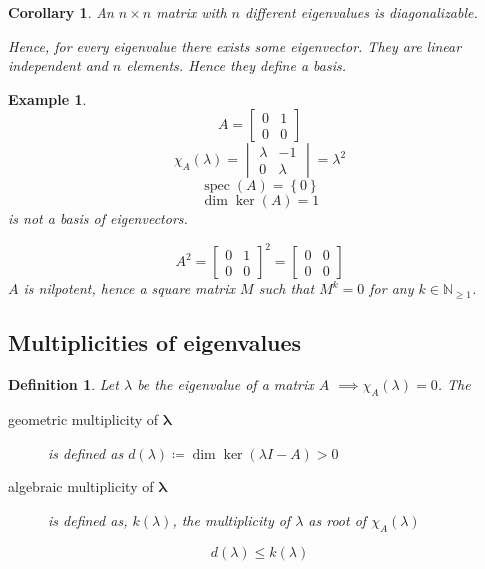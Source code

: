 \documentclass[a4paper]{article}
\newcounter{lecref}[section]
\numberwithin{lecref}{section}
\newtheorem{example}[lecref]{Example}
\newtheorem{definition}[lecref]{Definition}
\newtheorem{corollary}[lecref]{Corollary}
\newcommand{\set}[1]{\left\{#1\right\}}
\begin{document}
\begin{corollary} %
  An $n\times n$ matrix with $n$ different eigenvalues is diagonalizable.

  Hence, for every eigenvalue there exists some eigenvector. They are linear independent and $n$ elements.
  Hence they define a basis.
\end{corollary}

\begin{example} %
  \[ A = \begin{bmatrix} 0 & 1 \\ 0 & 0 \end{bmatrix} \]
  \[ \chi_A(\lambda) = \begin{vmatrix} \lambda & -1 \\ 0 & \lambda \end{vmatrix} = \lambda^2 \]
  \[ \operatorname{spec}(A) = \set{0} \]
  \[ \dim\ker(A) = 1 \]
  is not a basis of eigenvectors.

  \[ A^2 = \begin{bmatrix} 0 & 1 \\ 0 & 0 \end{bmatrix}^2 = \begin{bmatrix} 0 & 0 \\ 0 & 0 \end{bmatrix} \]
  $A$ is nilpotent, hence a square matrix $M$ such that $M^k = 0$ for any $k \in \mathbb N_{\geq1}$.
\end{example}

\subsection{Multiplicities of eigenvalues}

\begin{definition} %
  Let $\lambda$ be the eigenvalue of a matrix $A$ $\implies \chi_A(\lambda) = 0$. The
  \begin{description}
    \item[geometric multiplicity of $\mathbf\lambda$] is defined as $d(\lambda) \coloneqq \dim\ker(\lambda I - A) > 0$
    \item[algebraic multiplicity of $\mathbf\lambda$] is defined as, $k(\lambda)$, the multiplicity of $\lambda$ as root of $\chi_A(\lambda)$
  \end{description}
  \[ d(\lambda) \leq k(\lambda) \]
\end{definition}
\end{document}
